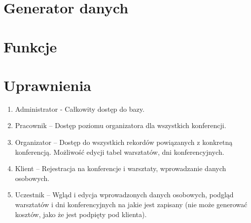 \documentclass{article}
\begin{document}
\section{Generator danych}
    
    
    
    
    
    
    
    
    
    
    
    
    
    
    
    
    
    
    
    
    
    
    
    
    
    

\newpage
\section{Funkcje}
    

\newpage
\section{Uprawnienia}
    \begin{enumerate}
        \item Administrator - Całkowity dostęp do bazy.
        \item Pracownik – Dostęp poziomu organizatora dla wszystkich konferencji. 
        \item Organizator – Dostęp do wszystkich rekordów powiązanych z konkretną konferencją. Możliwość edycji tabel warsztatów, dni konferencyjnych.  
        \item Klient – Rejestracja na konferencje i warsztaty, wprowadzanie danych osobowych.
        \item Uczestnik – Wgląd  i edycja wprowadzonych danych osobowych, podgląd warsztatów  i dni konferencyjnych na jakie jest zapisany (nie może generować kosztów, jako że jest podpięty pod klienta). 
    \end{enumerate}
\end{document}
